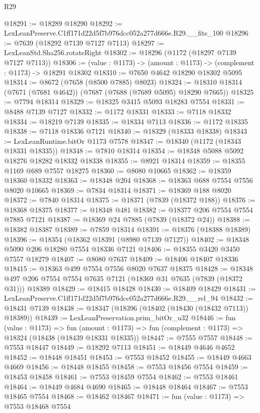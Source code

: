 \begin{lexlean}{R29}
\begin{coremodule}
@18291 := @18289 @18290
@18292 := LexLeanPreserve.C1ff171d22d5f7b976dcc052a277d666e.R29.__fits_100
@18296 := @7639 (@18292 @7139 @7127 @7113)
@18297 := LexLeanStd.Sha256.rotateRight
@18302 := @18296 (@1172 (@18297 @7139 @7127 @7113))
@18306 := (value : @1173) -> (amount : @1173) -> (complement : @1173) -> @18291 @18302
@18310 := @7650 @4642 @18290 @18302 @5095
@18314 := @8672 (@7658 (@8500 @7885) @8023)
@18324 := @18310 @18314 (@7671 (@7681 @4642)) (@7687 (@7688 (@7689 @5095) @18290 @7665))
@18325 := @7794 @18314
@18329 := @18325 @3415 @5093 @18283 @7554
@18331 := @8488 @7139 @7127
@18332 := @1172 @18331
@18333 := @7118 @18332
@18334 := @18219 @7139
@18335 := @18334 @7113
@18336 := @1172 @18335
@18338 := @7118 @18336 @7121
@18340 := @18329 (@18333 @18338)
@18343 := LexLeanRuntime.bitOr @1173 @7578
@18347 := @18340 (@1172 (@18343 @18331 @18335))
@18348 := @7810 @18314
@18354 := @18348 @5088 @5092 @18276 @18282 @18332 @18338
@18355 := @8921 @18314
@18359 := @18355 @1169 @689 @7557 @18275
@18360 := @8080 @10665
@18362 := @18359 @18360 @18332
@18363 := @18348 @204
@18368 := @18363 @688 @7554 @7556 @8020 @10665
@18369 := @7834 @18314
@18371 := @18369 @188 @8020
@18372 := @7840 @18314
@18375 := @18371 (@7839 (@18372 @188))
@18376 := @18368 @18375
@18377 := @18348 @481
@18382 := @18377 @206 @7554 @7554 @7885 @7121
@18387 := @18369 @24 @7885 (@7839 (@18372 @24))
@18388 := @18382 @18387
@18389 := @7859 @18314
@18391 := @18376 (@18388 @18389)
@18396 := @18354 (@18362 @18391 (@8980 @7139 @7127))
@18402 := @18348 @5090 @206 @18280 @7554 @18336 @7121
@18406 := @18355 @3420 @3450 @7557 @18279
@18407 := @8080 @7637
@18409 := @18406 @18407 @18336
@18415 := @18363 @499 @7554 @7556 @8020 @7637 @18375
@18428 := @18348 @497 @206 @7554 @7554 @7635 @7121 (@18369 @31 @7635 (@7839 (@18372 @31))) @18389
@18429 := @18415 @18428
@18430 := @18409 @18429
@18431 := LexLeanPreserve.C1ff171d22d5f7b976dcc052a277d666e.R29.__rel_94
@18432 := @18431 @7139
@18438 := @18347 (@18396 (@18402 (@18430 (@18432 @7113)) @18389))
@18439 := LexLeanPreservation.prim_bitOr_u32
@18446 := fun (value : @1173) =>
  fun (amount : @1173) => fun (complement : @1173) => @18324 (@18438 (@18439 @18331 @18335))
@18447 := @7555 @7557
@18448 := @7553 @18447
@18449 := @18292 @7113
@18451 := @18449 @4646 @4652
@18452 := @18448 @18451
@18453 := @7553 @18452
@18455 := @18449 @4663 @4669
@18456 := @18448 @18455
@18458 := @7553 @18456 @7554
@18459 := @18453 @18458
@18461 := @7553 @18459 @7554
@18462 := @7553 @18461
@18464 := @18449 @4684 @4690
@18465 := @18448 @18464
@18467 := @7553 @18465 @7554
@18468 := @18462 @18467
@18471 := fun (value : @1173) => @7553 @18468 @7554

\end{coremodule}
\end{lexlean}
